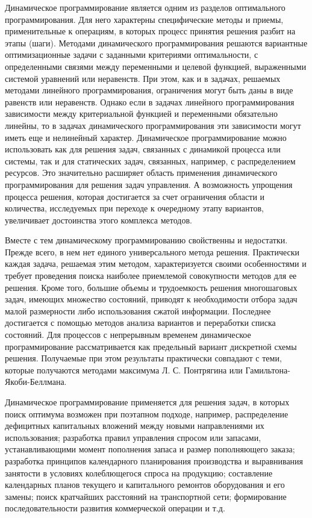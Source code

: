 Динамическое программирование является одним из разделов оптимального программирования. Для него характерны специфические методы и приемы, применительные к операциям, в которых процесс принятия решения разбит на этапы (шаги). Методами динамического программирования решаются вариантные оптимизационные задачи с заданными критериями оптимальности, с определенными связями между переменными и целевой функцией, выраженными системой уравнений или неравенств. При этом, как и в задачах, решаемых методами линейного программирования, ограничения могут быть даны в виде равенств или неравенств. Однако если в задачах линейного программирования зависимости между критериальной функцией и переменными обязательно линейны, то в задачах динамического программирования эти зависимости могут иметь еще и нелинейный характер. Динамическое программирование можно использовать как для решения задач, связанных с динамикой процесса или системы, так и для статических задач, связанных, например, с распределением ресурсов. Это значительно расширяет область применения динамического программирования для решения задач управления. А возможность упрощения процесса решения, которая достигается за счет ограничения области и количества, исследуемых при переходе к очередному этапу вариантов, увеличивает достоинства этого комплекса методов.

Вместе с тем динамическому программированию свойственны и недостатки. Прежде всего, в нем нет единого универсального метода решения. Практически каждая задача, решаемая этим методом, характеризуется своими особенностями и требует проведения поиска наиболее приемлемой совокупности методов для ее решения. Кроме того, большие объемы и трудоемкость решения многошаговых задач, имеющих множество состояний, приводят к необходимости отбора задач малой размерности либо использования сжатой информации. Последнее достигается с помощью методов анализа вариантов и переработки списка состояний.
Для процессов с непрерывным временем динамическое программирование рассматривается как предельный вариант дискретной схемы решения. Получаемые при этом результаты практически совпадают с теми, которые получаются методами максимума Л. С. Понтрягина или Гамильтона-Якоби-Беллмана.

Динамическое программирование применяется для решения задач, в которых поиск оптимума возможен при поэтапном подходе, например, распределение дефицитных капитальных вложений между новыми направлениями их использования; разработка правил управления спросом или запасами, устанавливающими момент пополнения запаса и размер пополняющего заказа; разработка принципов календарного планирования производства и выравнивания занятости в условиях колеблющегося спроса на продукцию; составление календарных планов текущего и капитального ремонтов оборудования и его замены; поиск кратчайших расстояний на транспортной сети; формирование последовательности развития коммерческой операции и т.д.